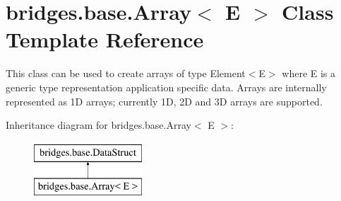 \hypertarget{classbridges_1_1base_1_1_array}{}\section{bridges.\+base.\+Array$<$ E $>$ Class Template Reference}
\label{classbridges_1_1base_1_1_array}


This class can be used to create arrays of type Element$<$\+E$>$ where E is a generic type representation application specific data. Arrays are internally represented as 1D arrays; currently 1D, 2D and 3D arrays are supported.  


Inheritance diagram for bridges.\+base.\+Array$<$ E $>$\+:\begin{figure}[H]
\begin{center}
\leavevmode
\includegraphics[height=2.000000cm]{classbridges_1_1base_1_1_array}
\end{center}
\end{figure}
